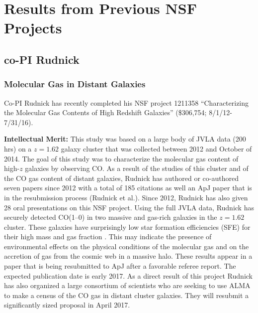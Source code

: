 \documentclass[11pt, preprint]{aastex}
\begin{document}
{\section{Results from Previous NSF Projects}
\vspace*{-.4cm}
\subsection{co-PI Rudnick}
\vspace*{-.4cm}
\label{Sec:prior_rudnick}
\subsubsection{Molecular Gas in Distant Galaxies}
\vspace*{-.4cm}

Co-PI Rudnick has recently completed his NSF project 1211358
``Characterizing the Molecular Gas Contents of High Redshift
Galaxies'' (\$306,754; 8/1/12-7/31/16).  

\textbf{Intellectual Merit:} This study was based on a large body of
JVLA data (200 hrs) on a $z=1.62$ galaxy cluster that was collected
between 2012 and October of 2014. The goal of this study was to
characterize the molecular gas content of high-$z$ galaxies by
observing CO. As a result of the studies of this cluster and of the CO
gas content of distant galaxies, Rudnick has authored or co-authored
seven papers since 2012 with a total of 185 citations
\citep{papovich12,rudnick12,lotz13,geach13,wong14,geach14,tran15} as
well an ApJ paper that is in the resubmission process (Rudnick et
al.).  Since 2012, Rudnick has also given 28 oral presentations on
this NSF project.
%
Using the full JVLA data, Rudnick has securely detected CO(1--0) in
two massive and gas-rich galaxies in the $z=1.62$ cluster. These
galaxies have surprisingly low star formation efficiencies (SFE) for
their high mass and gas fraction \citep[e.g.][]{genzel10}. This may
indicate the presence of environmental effects on the physical
conditions of the molecular gas and on the accretion of gas from the
cosmic web in a massive halo. These results appear in a paper that is
being resubmitted to ApJ after a favorable referee report.  The
expected publication date is early 2017.  As a direct result of this
project Rudnick has also organized a large consortium of scientists
who are seeking to use ALMA to make a census of the CO gas in distant
cluster galaxies.  They will resubmit a significantly sized proposal in
April 2017.

}
\end{document}
